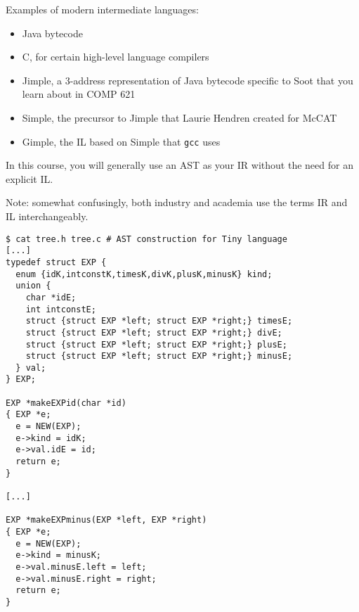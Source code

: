 \begin{slide*}
Examples of modern intermediate languages:
\begin{itemize}
\item Java bytecode
\item C, for certain high-level language compilers
\item Jimple, a 3-address representation of Java bytecode specific to
  Soot that you learn about in COMP 621
\item Simple, the precursor to Jimple that Laurie Hendren created for McCAT
\item Gimple, the IL based on Simple that {\tt gcc} uses
\end{itemize}

In this course, you will generally use an AST as your IR without the
need for an explicit IL.

\vspace{0.1in}

Note: somewhat confusingly, both industry and academia use the terms
IR and IL interchangeably.

\vfil
\end{slide*}
 
\begin{slide*}
\begin{scriptsize}
\begin{verbatim}
$ cat tree.h tree.c # AST construction for Tiny language
[...]
typedef struct EXP {
  enum {idK,intconstK,timesK,divK,plusK,minusK} kind;
  union {
    char *idE;
    int intconstE;
    struct {struct EXP *left; struct EXP *right;} timesE;
    struct {struct EXP *left; struct EXP *right;} divE;
    struct {struct EXP *left; struct EXP *right;} plusE;
    struct {struct EXP *left; struct EXP *right;} minusE;
  } val;  
} EXP;

EXP *makeEXPid(char *id)
{ EXP *e;
  e = NEW(EXP);
  e->kind = idK;
  e->val.idE = id;
  return e;
}

[...]

EXP *makeEXPminus(EXP *left, EXP *right)
{ EXP *e;  
  e = NEW(EXP);
  e->kind = minusK;
  e->val.minusE.left = left;
  e->val.minusE.right = right;
  return e;
}
\end{verbatim}
\end{scriptsize}
\vfil
\end{slide*}
 
